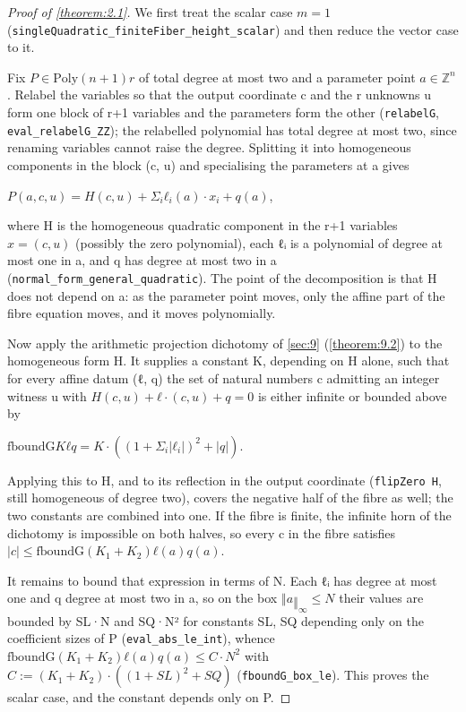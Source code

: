 \begin{proof}[Proof of \cref{theorem:2.1}]
We first treat the scalar case $m = 1$ (\texttt{singleQuadratic\_\allowbreak{}finiteFiber\_\allowbreak{}height\_\allowbreak{}scalar}) and then reduce the vector case to it.

Fix $P ∈ \mathrm{Poly} (n+1) r$ of total degree at most two and a parameter point $a ∈ ℤ^{n}$. Relabel the variables so that the output coordinate c and the r unknowns u form one block of r+1 variables and the parameters form the other (\texttt{relabelG}, \texttt{eval\_\allowbreak{}relabelG\_\allowbreak{}ZZ}); the relabelled polynomial has total degree at most two, since renaming variables cannot raise the degree. Splitting it into homogeneous components in the block (c, u) and specialising the parameters at a gives

$P(a, c, u) = H(c,u) + Σ_{i} ℓ_{i}(a)·x_{i} + q(a)$,

where H is the homogeneous quadratic component in the r+1 variables $x = (c, u)$ (possibly the zero polynomial), each ℓᵢ is a polynomial of degree at most one in a, and q has degree at most two in a (\texttt{normal\_\allowbreak{}form\_\allowbreak{}general\_\allowbreak{}quadratic}). The point of the decomposition is that H does not depend on a: as the parameter point moves, only the affine part of the fibre equation moves, and it moves polynomially.

Now apply the arithmetic projection dichotomy of \cref{sec:9} (\cref{theorem:9.2}) to the homogeneous form H. It supplies a constant K, depending on H alone, such that for every affine datum (ℓ, q) the set of natural numbers c admitting an integer witness u with $H(c,u) + ℓ·(c,u) + q = 0$ is either infinite or bounded above by

$\mathrm{fboundG} K ℓ q = K·((1 + Σ_{i}|ℓ_{i}|)^{2} + |q|)$.

Applying this to H, and to its reflection in the output coordinate (\texttt{flipZero H}, still homogeneous of degree two), covers the negative half of the fibre as well; the two constants are combined into one. If the fibre is finite, the infinite horn of the dichotomy is impossible on both halves, so every c in the fibre satisfies $|c| ≤ \mathrm{fboundG} (K_{1}+K_{2}) ℓ(a) q(a)$.

It remains to bound that expression in terms of N. Each ℓᵢ has degree at most one and q degree at most two in a, so on the box $‖a‖_{∞} ≤ N$ their values are bounded by SL·N and SQ·N² for constants SL, SQ depending only on the coefficient sizes of P (\texttt{eval\_\allowbreak{}abs\_\allowbreak{}le\_\allowbreak{}int}), whence $\mathrm{fboundG} (K_{1}+K_{2}) ℓ(a) q(a) ≤ C·N^{2}$ with $C := (K_{1}+K_{2})·((1+SL)^{2} + SQ)$ (\texttt{fboundG\_\allowbreak{}box\_\allowbreak{}le}). This proves the scalar case, and the constant depends only on P.


\end{proof}
